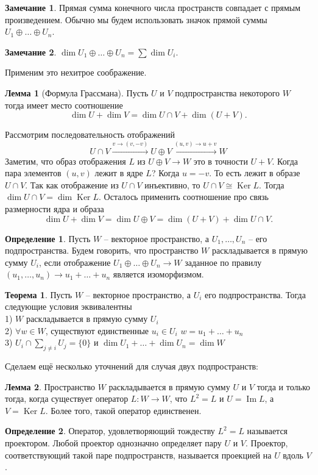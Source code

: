 \documentclass[10pt,a4paper,oneside]{book} %
\theoremstyle{definition}
\newtheorem*{rem}{Замечание}
\newtheorem*{defn}{Определение}
\newtheorem{thm}{Теорема}
\newtheorem{lem}{Лемма}
\DeclareMathOperator{\Ker}{Ker}
\newcommand{\im}{\operatorname{Im}}
\def\thrm{\begin{thm}}
\def\ethrm{\end{thm}}
\def\dfn{\begin{defn}}
\def\edfn{\end{defn}}
\def\lm{\begin{lem}}
\def\elm{\end{lem}}
\def\rm{\begin{rem}}
\def\erm{\end{rem}}
\begin{document}
\rm Прямая сумма конечного числа пространств совпадает с прямым произведением. Обычно мы будем использовать значок прямой суммы $U_1\oplus \dots \oplus U_n$.
\erm


\rm $\dim U_1\oplus \dots \oplus U_n= \sum \dim U_i$.
\erm

Применим это нехитрое соображение.


\lm[Формула Грассмана] Пусть $U$ и $V$ подпространства некоторого $W$ тогда имеет место соотношение
$$\dim U +\dim V = \dim U\cap V + \dim (U+V).$$

\proof Рассмотрим последовательность отображений
$$U\cap V \stackrel{v\to (v,-v)}{\longrightarrow} U\oplus V \stackrel{(u,v)\to u+v}{\longrightarrow} W$$
Заметим, что образ отображения $L$ из $U\oplus V \to W$ это в точности $U+V$. Когда пара элементов $(u,v)$ лежит в ядре $L$? Когда $u=-v$. То есть лежит в образе $U \cap V$. Так как отображение из $U\cap V$ инъективно, то $U\cap V \cong \Ker L$. Тогда $\dim U\cap V = \dim \Ker L $. Осталось применить соотношение про связь размерности ядра и образа
$$\dim U+ \dim V = \dim U\oplus V= \dim(U+V)+\dim U\cap V.$$
\endproof
\elm

\dfn Пусть $W$ -- векторное пространство, а $U_1,\dots,U_n$ -- его подпространства. Будем говорить, что пространство $W$ раскладывается в прямую сумму $U_i$, если отображение $U_1\oplus \dots \oplus U_n \to W$ заданное по правилу $(u_1,\dots,u_n) \to u_1 +\dots+u_n$ является изоморфизмом.
\edfn

\thrm
Пусть $W$ -- векторное пространство, а $U_i$ его подпространства. Тогда следующие условия эквивалентны\\
1) $W$ раскладывается в прямую сумму $U_i$ \\
2) $\forall w \in W$, существуют единственные $u_i \in U_i$  $w=u_1+\dots+u_n$\\
3) $U_i\cap \sum_{j\neq i} U_j= \{0\}$ и $\dim U_1 +\dots+ \dim U_n =\dim W$\\
\ethrm

Сделаем ещё несколько уточнений для случая двух подпространств:

\lm Пространство $W$ раскладывается в прямую сумму $U$   и $V$ тогда и только тогда, когда существует оператор $L \colon W \to W$, что $L^2=L$ и $U=\im L$, а $V=\Ker L$. Более того, такой оператор единственен.
\elm

\dfn Оператор, удовлетворяющий тождеству $L^2=L$ называется проектором.
 Любой проектор однозначно определяет пару $U$ и $V$. Проектор, соответствующий такой паре подпространств, называется проекцией на $U$ вдоль $V$.
\edfn
\end{document}

